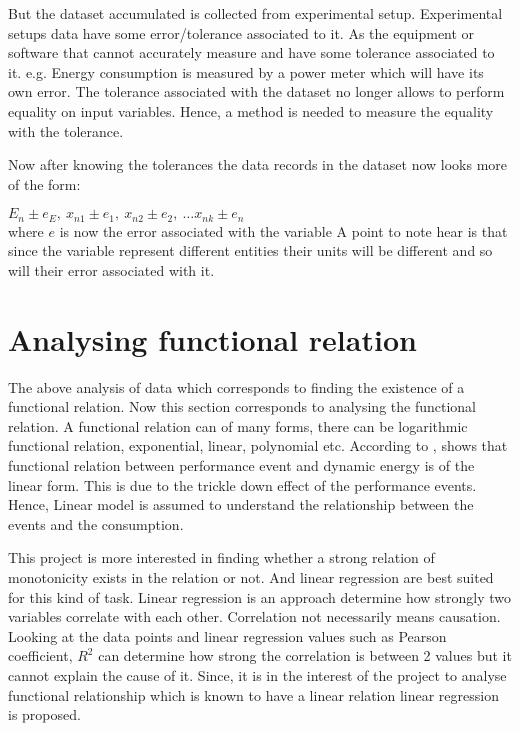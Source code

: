 But the dataset accumulated is collected from experimental setup. Experimental setups data have some error/tolerance associated to it. As the equipment or software that cannot accurately measure and have some tolerance associated to it. e.g. Energy consumption is measured by a power meter which will have its own error. The tolerance associated with the dataset no longer allows to perform equality on input variables. Hence, a method is needed to measure the equality with the tolerance.

Now after knowing the tolerances the data records in the dataset now looks more of the form:

\(E_n \pm e_E,\ x_{n1} \pm e_1,\ x_{n2} \pm e_2,\ \ldots x_{nk} \pm e_n\)\\
where \(e\) is now the error associated with the variable
A point to note hear is that since the variable represent different entities their units will be different and so will their error associated with it.

\section{Analysing functional relation}

The above analysis of data which corresponds to finding the existence of a functional relation. Now this section corresponds to analysing the functional relation. A functional relation can of many forms, there can be logarithmic functional relation, exponential, linear, polynomial etc. According to \cite{bircher2007complete}, shows that functional relation between performance event and dynamic energy is of the linear form. This is due to the trickle down effect of the performance events.
Hence, Linear model is assumed to understand the relationship between the events and the consumption. 

This project is more interested in finding whether a strong relation of monotonicity exists in the relation or not. And linear regression are best suited for this kind of task. Linear regression is an approach determine how strongly two variables correlate with each other. Correlation not necessarily means causation. Looking at the data points and linear regression values such as Pearson coefficient, $R^2$ can determine how strong the correlation is between 2 values but it cannot explain the cause of it. Since, it is in the interest of the project to analyse functional relationship which is known to have a linear relation linear regression is proposed.

